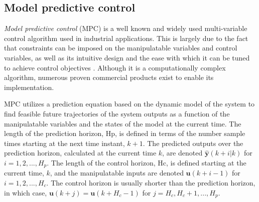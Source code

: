 {\subsection{Model predictive control}

\textit{Model predictive control} (\gls{MPC}) is a well known and widely used multi-variable control algorithm used in industrial applications. This is largely due to the fact that constraints can be imposed on the manipulatable variables and control variables, as well as its intuitive design and the ease with which it can be tuned to achieve control objectives \citep{maciejowski_predictive_2002}. Although it is a computationally complex algorithm, numerous proven commercial products exist to enable its implementation.

\gls{MPC} utilizes a prediction equation based on the dynamic model of the system to find feasible future trajectories of the system outputs as a function of the manipulatable variables and the states of the model at the current time. The length of the prediction horizon, \gls{Hp}, is defined in terms of the number sample times starting at the next time instant, $k+1$. The predicted outputs over the prediction horizon, calculated at the current time $k$, are denoted $\hat{\textbf{y}}(k+i | k)$ for $i=1,2,...,H_p$. The length of the control horizon, \gls{Hc}, is defined starting at the current time, $k$, and the manipulatable inputs are denoted $\mathbf{u}(k+i-1)$ for $i=1,2,...,H_c$. The control horizon is usually shorter than the prediction horizon, in which case, $\mathbf{u}(k+j)=\mathbf{u}(k+H_c-1)$ for $j=H_c,H_c+1,...,H_p$.

}
